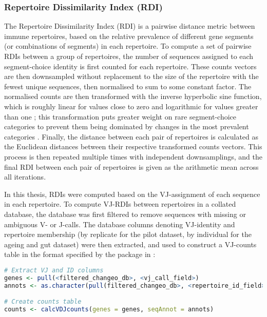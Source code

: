\subsubsection{Repertoire Dissimilarity Index (RDI)}
\label{sec:methods_comp_igdownstream_rdi}

The Repertoire Dissimilarity Index (RDI) \parencite{bolen2017rdi} is a pairwise distance metric between immune repertoires, based on the relative prevalence of different gene segments (or combinations of segments) in each repertoire. To compute a set of pairwise RDIs between a group of repertoires, the number of sequences assigned to each segment-choice identity is first counted for each repertoire. These counts vectors are then downsampled without replacement to the size of the repertoire with the fewest unique sequences, then normalised to sum to some constant factor. The normalised counts are then transformed with the inverse hyperbolic sine function, which is roughly linear for values close to zero and logarithmic for values greater than one \parencite{bolen2017rdi}; this transformation puts greater weight on rare segment-choice categories to prevent them being dominated by changes in the most prevalent categories \parencite{bolen2017rdi}. Finally, the distance between each pair of repertoires is calculated as the Euclidean distances between their respective transformed counts vectors. This process is then repeated multiple times with independent downsamplings, and the final RDI between each pair of repertoires is given as the arithmetic mean across all iterations.

In this thesis, RDIs were computed based on the VJ-assignment of each sequence in each repertoire. To compute VJ-RDIs between repertoires in a collated  database, the database was first filtered to remove sequences with missing or ambiguous V- or J-calls. The database columns denoting VJ-identity and repertoire membership (by replicate for the pilot dataset, by individual for the ageing and gut dataset) were then extracted, and used to construct a VJ-counts table in the format specified by the  package \parencite{bolen2017rdi} in :

\begin{lstlisting}[language=R]
# Extract VJ and ID columns
genes <- pull(<filtered_changeo_db>, <vj_call_field>)
annots <- as.character(pull(filtered_changeo_db>, <repertoire_id_field>))

# Create counts table
counts <- calcVDJcounts(genes = genes, seqAnnot = annots)
\end{lstlisting}

